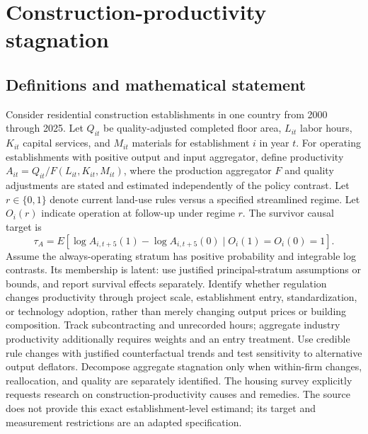 \documentclass[11pt]{article}
\begin{document}
\section*{Construction-productivity stagnation}\label{30007744}
\subsection{Definitions and mathematical statement}
Consider residential construction establishments in one country from 2000 through 2025. Let \(Q_{it}\) be quality-adjusted completed floor area, \(L_{it}\) labor hours, \(K_{it}\) capital services, and \(M_{it}\) materials for establishment \(i\) in year \(t\). For operating establishments with positive output and input aggregator, define productivity \(A_{it}=Q_{it}/F(L_{it},K_{it},M_{it})\), where the production aggregator \(F\) and quality adjustments are stated and estimated independently of the policy contrast. Let \(r\in\{0,1\}\) denote current land-use rules versus a specified streamlined regime. Let \(O_i(r)\) indicate operation at follow-up under regime \(r\). The survivor causal target is
\[\tau_A=E[\log A_{i,t+5}(1)-\log A_{i,t+5}(0)\mid O_i(1)=O_i(0)=1].\]
Assume the always-operating stratum has positive probability and integrable log contrasts. Its membership is latent: use justified principal-stratum assumptions or bounds, and report survival effects separately. Identify whether regulation changes productivity through project scale, establishment entry, standardization, or technology adoption, rather than merely changing output prices or building composition. Track subcontracting and unrecorded hours; aggregate industry productivity additionally requires weights and an entry treatment. Use credible rule changes with justified counterfactual trends and test sensitivity to alternative output deflators. Decompose aggregate stagnation only when within-firm changes, reallocation, and quality are separately identified. The housing survey explicitly requests research on construction-productivity causes and remedies. The source does not provide this exact establishment-level estimand; its target and measurement restrictions are an adapted specification.
\end{document}
